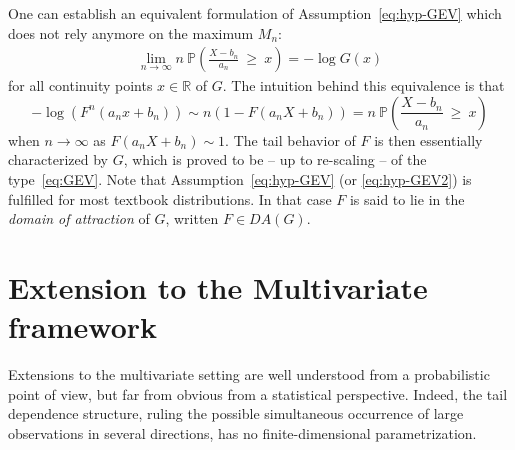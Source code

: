 One can establish an equivalent formulation of Assumption~\eqref{eq:hyp-GEV} which does not rely anymore on the maximum $M_n$:
\begin{align}
\label{eq:hyp-GEV2} %
\lim_{n \to \infty} n ~\mathbb{P}\left( \frac{X - b_n}{a_n} ~\ge~ x \right) = -\log G(x)
\end{align}
for all continuity points $x \in \mathbb{R}$ of $G$.
The intuition behind this equivalence is that $$- \log(F^n(a_n x + b_n)) \sim n (1 - F(a_n X + b_n)) = n ~\mathbb{P}\left( \frac{X - b_n}{a_n}~\ge~ x \right)$$ when $n \to \infty$ as $F(a_n X + b_n) \sim 1$.
 The tail behavior of $F$
is then essentially characterized by $G$, which is proved to be -- up
to  re-scaling -- of the type~\eqref{eq:GEV}. 
\medskip
Note that Assumption~\eqref{eq:hyp-GEV} (or \eqref{eq:hyp-GEV2}) is fulfilled for most textbook distributions. In that case $F$ is said to lie in the \textit{domain of  attraction} of $G$, written $F \in DA(G)$.


\section{Extension to the Multivariate framework}
\label{back:sec:MEVT} 

Extensions to the multivariate setting are well understood
from a probabilistic point of view, but far from obvious from a
statistical perspective. Indeed, the tail dependence structure, ruling the possible simultaneous occurrence of large observations in several directions, has no finite-dimensional parametrization.

